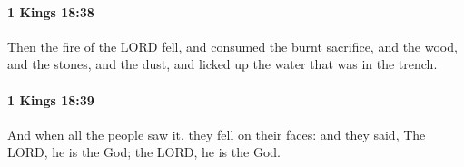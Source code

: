 		\paragraph{1 Kings 18:38} %
			\label{1KINGS-18-38}

			Then the fire of the LORD fell, and consumed the burnt sacrifice, and the wood, and the stones, and the dust, and licked up the water that was in the trench.


		\paragraph{1 Kings 18:39} %
			\label{1KINGS-18-39}

			And when all the people saw it, they fell on their faces: and they said, The LORD, he is the God; the LORD, he is the God.


